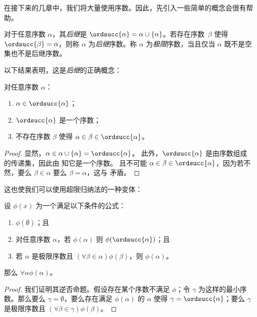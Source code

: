 \documentclass[../../../include/open-logic-section]{subfiles}
\begin{document}

在接下来的几章中，我们将大量使用序数。因此，先引入一些简单的概念会很有帮助。

\begin{defn}
对于任意序数 $\alpha$，其\emph{后继}是 $\ordsucc{\alpha}
=\alpha \cup \{\alpha\}$。若存在序数~$\beta$ 使得 $\ordsucc{\beta} = \alpha$，则称 $\alpha$ 为\emph{后继}序数。称 $\alpha$ 为\emph{极限}序数，当且仅当 $\alpha$ 既不是空集也不是后继序数。
\end{defn}

\noindent
以下结果表明，这是\emph{后继}的正确概念：

\begin{prop}
对任意序数 $\alpha$：
\begin{enumerate}
	\item $\alpha \in \ordsucc{\alpha}$；
	\item $\ordsucc{\alpha}$ 是一个序数；
	\item 不存在序数 $\beta$ 使得 $\alpha \in \beta \in \ordsucc{\alpha}$。
	\end{enumerate}
\end{prop}

\begin{proof}
显然，$\alpha \in \alpha \cup \{\alpha\} = \ordsucc{\alpha}$。
此外，$\ordsucc{\alpha}$ 是由序数组成的传递集，因此由  知它是一个序数。
且不可能 $\alpha \in \beta \in \ordsucc{\alpha}$，因为若不然，要么 $\beta \in \alpha$ 要么 $\beta = \alpha$，这与  矛盾。
\end{proof}

\noindent
这也使我们可以使用超限归纳法的一种变体：

\begin{thm}[简单超限归纳法]
设 $\phi(x)$ 为一个满足以下条件的公式：
\begin{enumerate}
	\item $\phi(\emptyset)$；且
	\item 对任意序数 $\alpha$，若 $\phi(\alpha)$ 则 $\phi(\ordsucc{\alpha})$；且
	\item 若 $\alpha$ 是极限序数且 $(\forall \beta \in \alpha)\phi(\beta)$，则 $\phi(\alpha)$。
\end{enumerate}
那么 $\forall \alpha \phi(\alpha)$。
\end{thm}

\begin{proof}
我们证明其逆否命题。假设存在某个序数不满足 $\phi$；令 $\gamma$ 为这样的最小序数。那么要么 $\gamma = \emptyset$，要么存在满足 $\phi(\alpha)$ 的 $\alpha$ 使得 $\gamma = \ordsucc{\alpha}$；要么 $\gamma$ 是极限序数且 $(\forall \beta \in \gamma)\phi(\beta)$。
\end{proof}
\end{document}
